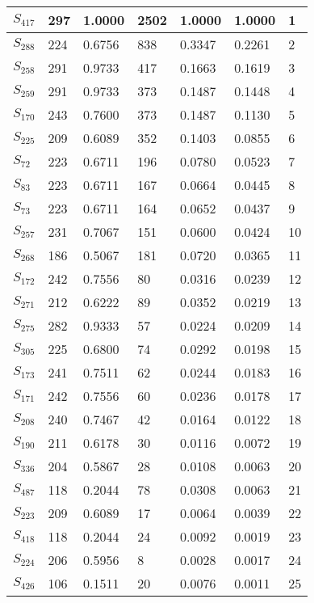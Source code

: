 \begin{xltabular}{\textwidth}{|X|X|X|X|X|X|X|}
        \hline
        \endlastfoot
    $S_{417}$ & 297 & 1.0000 & 2502 & 1.0000 & 1.0000 & 1 \\ \hline
 $S_{288}$ & 224 & 0.6756 & 838 & 0.3347 & 0.2261 & 2 \\ \hline
 $S_{258}$ & 291 & 0.9733 & 417 & 0.1663 & 0.1619 & 3 \\ \hline
 $S_{259}$ & 291 & 0.9733 & 373 & 0.1487 & 0.1448 & 4 \\ \hline
 $S_{170}$ & 243 & 0.7600 & 373 & 0.1487 & 0.1130 & 5 \\ \hline
 $S_{225}$ & 209 & 0.6089 & 352 & 0.1403 & 0.0855 & 6 \\ \hline
 $S_{72}$ & 223 & 0.6711 & 196 & 0.0780 & 0.0523 & 7 \\ \hline
 $S_{83}$ & 223 & 0.6711 & 167 & 0.0664 & 0.0445 & 8 \\ \hline
 $S_{73}$ & 223 & 0.6711 & 164 & 0.0652 & 0.0437 & 9 \\ \hline
 $S_{257}$ & 231 & 0.7067 & 151 & 0.0600 & 0.0424 & 10 \\ \hline
 $S_{268}$ & 186 & 0.5067 & 181 & 0.0720 & 0.0365 & 11 \\ \hline
 $S_{172}$ & 242 & 0.7556 & 80 & 0.0316 & 0.0239 & 12 \\ \hline
 $S_{271}$ & 212 & 0.6222 & 89 & 0.0352 & 0.0219 & 13 \\ \hline
 $S_{275}$ & 282 & 0.9333 & 57 & 0.0224 & 0.0209 & 14 \\ \hline
 $S_{305}$ & 225 & 0.6800 & 74 & 0.0292 & 0.0198 & 15 \\ \hline
 $S_{173}$ & 241 & 0.7511 & 62 & 0.0244 & 0.0183 & 16 \\ \hline
 $S_{171}$ & 242 & 0.7556 & 60 & 0.0236 & 0.0178 & 17 \\ \hline
 $S_{208}$ & 240 & 0.7467 & 42 & 0.0164 & 0.0122 & 18 \\ \hline
 $S_{190}$ & 211 & 0.6178 & 30 & 0.0116 & 0.0072 & 19 \\ \hline
 $S_{336}$ & 204 & 0.5867 & 28 & 0.0108 & 0.0063 & 20 \\ \hline
 $S_{487}$ & 118 & 0.2044 & 78 & 0.0308 & 0.0063 & 21 \\ \hline
 $S_{223}$ & 209 & 0.6089 & 17 & 0.0064 & 0.0039 & 22 \\ \hline
 $S_{418}$ & 118 & 0.2044 & 24 & 0.0092 & 0.0019 & 23 \\ \hline
 $S_{224}$ & 206 & 0.5956 & 8 & 0.0028 & 0.0017 & 24 \\ \hline
 $S_{426}$ & 106 & 0.1511 & 20 & 0.0076 & 0.0011 & 25 \\ \hline

\end{xltabular}
